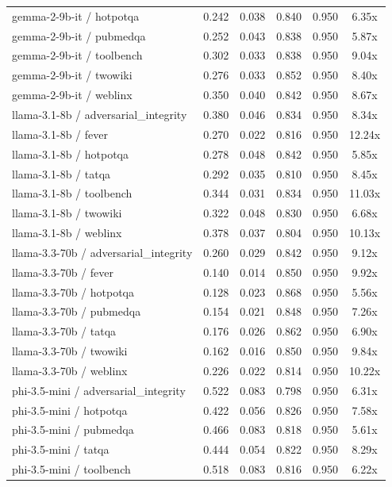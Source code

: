 \begin{table}[h]
\begin{tabular}{l|cc|cc|c}
gemma-2-9b-it / hotpotqa & 0.242 & 0.038 & 0.840 & 0.950 & 6.35x \\
gemma-2-9b-it / pubmedqa & 0.252 & 0.043 & 0.838 & 0.950 & 5.87x \\
gemma-2-9b-it / toolbench & 0.302 & 0.033 & 0.838 & 0.950 & 9.04x \\
gemma-2-9b-it / twowiki & 0.276 & 0.033 & 0.852 & 0.950 & 8.40x \\
gemma-2-9b-it / weblinx & 0.350 & 0.040 & 0.842 & 0.950 & 8.67x \\
llama-3.1-8b / adversarial_integrity & 0.380 & 0.046 & 0.834 & 0.950 & 8.34x \\
llama-3.1-8b / fever & 0.270 & 0.022 & 0.816 & 0.950 & 12.24x \\
llama-3.1-8b / hotpotqa & 0.278 & 0.048 & 0.842 & 0.950 & 5.85x \\
llama-3.1-8b / tatqa & 0.292 & 0.035 & 0.810 & 0.950 & 8.45x \\
llama-3.1-8b / toolbench & 0.344 & 0.031 & 0.834 & 0.950 & 11.03x \\
llama-3.1-8b / twowiki & 0.322 & 0.048 & 0.830 & 0.950 & 6.68x \\
llama-3.1-8b / weblinx & 0.378 & 0.037 & 0.804 & 0.950 & 10.13x \\
llama-3.3-70b / adversarial_integrity & 0.260 & 0.029 & 0.842 & 0.950 & 9.12x \\
llama-3.3-70b / fever & 0.140 & 0.014 & 0.850 & 0.950 & 9.92x \\
llama-3.3-70b / hotpotqa & 0.128 & 0.023 & 0.868 & 0.950 & 5.56x \\
llama-3.3-70b / pubmedqa & 0.154 & 0.021 & 0.848 & 0.950 & 7.26x \\
llama-3.3-70b / tatqa & 0.176 & 0.026 & 0.862 & 0.950 & 6.90x \\
llama-3.3-70b / twowiki & 0.162 & 0.016 & 0.850 & 0.950 & 9.84x \\
llama-3.3-70b / weblinx & 0.226 & 0.022 & 0.814 & 0.950 & 10.22x \\
phi-3.5-mini / adversarial_integrity & 0.522 & 0.083 & 0.798 & 0.950 & 6.31x \\
phi-3.5-mini / hotpotqa & 0.422 & 0.056 & 0.826 & 0.950 & 7.58x \\
phi-3.5-mini / pubmedqa & 0.466 & 0.083 & 0.818 & 0.950 & 5.61x \\
phi-3.5-mini / tatqa & 0.444 & 0.054 & 0.822 & 0.950 & 8.29x \\
phi-3.5-mini / toolbench & 0.518 & 0.083 & 0.816 & 0.950 & 6.22x \\

\end{tabular}
\end{table}

